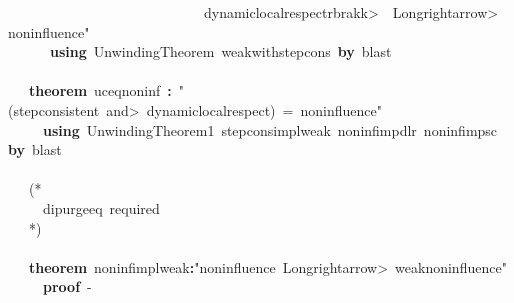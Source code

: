 \documentclass{article}
\newcommand{\syntaxCOMMENTA}[1]{\textcolor[rgb]{0.8,0.0,0.0}{#1}}
\newcommand{\syntaxKEYWORDA}[1]{\textcolor[rgb]{0.0,0.4,0.6}{\textbf{#1}}}
\newcommand{\syntaxLITERALA}[1]{\textcolor[rgb]{1.0,0.0,0.8}{#1}}
\newcommand{\syntaxOPERATOR}[1]{\textcolor[rgb]{0.0,0.0,0.0}{\textbf{#1}}}
\newcommand{\syntaxCOMMENTA}[1]{\textcolor[rgb]{0.8,0.0,0.0}{#1}}
\newcommand{\syntaxKEYWORDA}[1]{\textcolor[rgb]{0.0,0.4,0.6}{\textbf{#1}}}
\newcommand{\syntaxLITERALA}[1]{\textcolor[rgb]{1.0,0.0,0.8}{#1}}
\newcommand{\syntaxOPERATOR}[1]{\textcolor[rgb]{0.0,0.0,0.0}{\textbf{#1}}}
\newcommand{\syntaxCOMMENTA}[1]{\textcolor[rgb]{0.8,0.0,0.0}{#1}}
\newcommand{\syntaxKEYWORDA}[1]{\textcolor[rgb]{0.0,0.4,0.6}{\textbf{#1}}}
\newcommand{\syntaxLITERALA}[1]{\textcolor[rgb]{1.0,0.0,0.8}{#1}}
\newcommand{\syntaxOPERATOR}[1]{\textcolor[rgb]{0.0,0.0,0.0}{\textbf{#1}}}
\newcommand{\syntaxCOMMENTA}[1]{\textcolor[rgb]{0.8,0.0,0.0}{\textbf{#1}}}
\newcommand{\syntaxKEYWORDA}[1]{\textcolor[rgb]{0.0,0.4,0.6}{#1}}
\newcommand{\syntaxLITERALA}[1]{\textcolor[rgb]{1.0,0.0,0.8}{\textbf{#1}}}
\newcommand{\syntaxOPERATOR}[1]{\textcolor[rgb]{0.0,0.0,0.0}{#1}}
\newcommand{\syntaxCOMMENTA}[1]{\textcolor[rgb]{0.8,0.0,0.0}{#1}}
\newcommand{\syntaxKEYWORDA}[1]{\textcolor[rgb]{0.0,0.4,0.6}{\textbf{#1}}}
\newcommand{\syntaxLITERALA}[1]{\textcolor[rgb]{1.0,0.0,0.8}{#1}}
\newcommand{\syntaxOPERATOR}[1]{\textcolor[rgb]{0.0,0.0,0.0}{\textbf{#1}}}
\newcommand{\syntaxCOMMENTA}[1]{\textcolor[rgb]{0.8,0.0,0.0}{#1}}
\newcommand{\syntaxKEYWORDA}[1]{\textcolor[rgb]{0.0,0.4,0.6}{\textbf{#1}}}
\newcommand{\syntaxLITERALA}[1]{\textcolor[rgb]{1.0,0.0,0.8}{#1}}
\newcommand{\syntaxOPERATOR}[1]{\textcolor[rgb]{0.0,0.0,0.0}{\textbf{#1}}}
\begin{document}
\syntaxLITERALA{{\ }{\ }{\ }{\ }{\ }{\ }{\ }{\ }{\ }{\ }{\ }{\ }{\ }{\ }{\ }{\ }{\ }{\ }{\ }{\ }{\ }{\ }{\ }{\ }{\ }{\ }{\ }{\ }dynamic\usebox{\underscorebox}local\usebox{\underscorebox}respect\<rbrakk>{\ }{\ }\<Longrightarrow>{\ }noninfluence"}\hspace*{\fill}\\
{\ }{\ }{\ }{\ }{\ }{\ }\syntaxKEYWORDA{using}{\ }UnwindingTheorem{\ }weak\usebox{\underscorebox}with\usebox{\underscorebox}step\usebox{\underscorebox}cons{\ }\syntaxKEYWORDA{by}{\ }blast\hspace*{\fill}\\
\hspace*{\fill}\\
{\ }{\ }{\ }\syntaxKEYWORDA{theorem}{\ }uc\usebox{\underscorebox}eq\usebox{\underscorebox}noninf{\ }\syntaxOPERATOR{:}{\ }\syntaxLITERALA{"(step\usebox{\underscorebox}consistent{\ }\<and>{\ }dynamic\usebox{\underscorebox}local\usebox{\underscorebox}respect){\ }={\ }noninfluence"}\hspace*{\fill}\\
{\ }{\ }{\ }{\ }{\ }\syntaxKEYWORDA{using}{\ }UnwindingTheorem1{\ }step\usebox{\underscorebox}cons\usebox{\underscorebox}impl\usebox{\underscorebox}weak{\ }noninf\usebox{\underscorebox}imp\usebox{\underscorebox}dlr{\ }noninf\usebox{\underscorebox}imp\usebox{\underscorebox}sc{\ }\syntaxKEYWORDA{by}{\ }blast\hspace*{\fill}\\
\hspace*{\fill}\\
{\ }{\ }{\ }\syntaxCOMMENTA{(*}\hspace*{\fill}\\
\syntaxCOMMENTA{{\ }{\ }{\ }{\ }{\ }dipurge\usebox{\underscorebox}eq{\ }required}\hspace*{\fill}\\
\syntaxCOMMENTA{{\ }{\ }{\ }*)}\hspace*{\fill}\\
\hspace*{\fill}\\
{\ }{\ }{\ }\syntaxKEYWORDA{theorem}{\ }noninf\usebox{\underscorebox}impl\usebox{\underscorebox}weak\syntaxOPERATOR{:}\syntaxLITERALA{"noninfluence{\ }\<Longrightarrow>{\ }weak\usebox{\underscorebox}noninfluence"}\hspace*{\fill}\\
{\ }{\ }{\ }{\ }{\ }\syntaxKEYWORDA{proof}{\ }{-}\hspace*{\fill}\\
\end{document}
